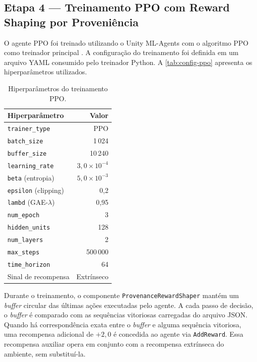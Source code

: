 \subsection{Etapa 4 --- Treinamento PPO com Reward Shaping por Proveniência}
\label{subsec:etapa4}

O agente PPO foi treinado utilizando o Unity ML-Agents com o algoritmo PPO
como treinador principal \cite{schulman2017ppo}. A configuração do
treinamento foi definida em um arquivo YAML consumido pelo treinador Python.
A \autoref{tab:config-ppo} apresenta os hiperparâmetros utilizados.

\begin{table}[htb]
    \centering
    \caption{Hiperparâmetros do treinamento PPO.}
    \label{tab:config-ppo}
    \begin{tabular}{l r}
        \toprule
        \textbf{Hiperparâmetro}          & \textbf{Valor}  \\
        \midrule
        \texttt{trainer\_type}           & PPO             \\
        \texttt{batch\_size}             & 1\,024          \\
        \texttt{buffer\_size}            & 10\,240         \\
        \texttt{learning\_rate}          & $3{,}0 \times 10^{-4}$ \\
        \texttt{beta} (entropia)         & $5{,}0 \times 10^{-3}$ \\
        \texttt{epsilon} (clipping)      & 0,2             \\
        \texttt{lambd} (GAE-$\lambda$)   & 0,95            \\
        \texttt{num\_epoch}              & 3               \\
        \texttt{hidden\_units}           & 128             \\
        \texttt{num\_layers}             & 2               \\
        \texttt{max\_steps}              & 500\,000        \\
        \texttt{time\_horizon}           & 64              \\
        Sinal de recompensa              & Extrínseco      \\
        \bottomrule
    \end{tabular}
\end{table}

Durante o treinamento, o componente \texttt{ProvenanceRewardShaper} mantém um
\textit{buffer} circular das últimas ações executadas pelo agente. A cada
passo de decisão, o \textit{buffer} é comparado com as sequências vitoriosas
carregadas do arquivo JSON. Quando há correspondência exata entre o
\textit{buffer} e alguma sequência vitoriosa, uma recompensa adicional de
$+2{,}0$ é concedida ao agente via \texttt{AddReward}. Essa recompensa
auxiliar opera em conjunto com a recompensa extrínseca do ambiente, sem
substituí-la.

